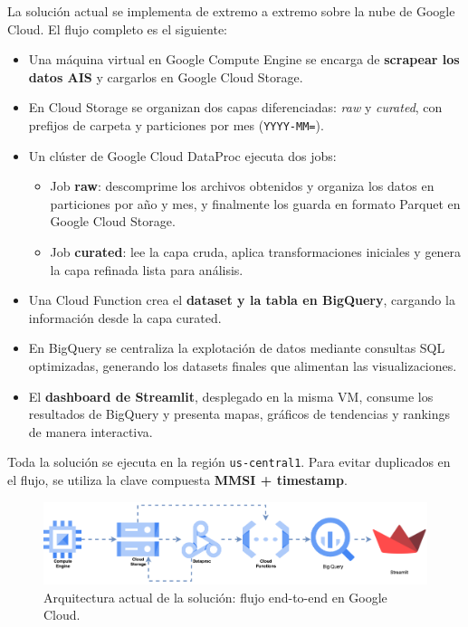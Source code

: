 \documentclass[10pt]{article}
\begin{document}
La solución actual se implementa de extremo a extremo sobre la nube de Google Cloud. El flujo completo es el siguiente:

\begin{itemize}
    \item Una máquina virtual en Google Compute Engine se encarga de \textbf{scrapear los datos AIS} y cargarlos en Google Cloud Storage. 
    \item En Cloud Storage se organizan dos capas diferenciadas: \textit{raw} y \textit{curated}, con prefijos de carpeta y particiones por mes (\texttt{YYYY-MM=}).
    \item Un clúster de Google Cloud DataProc ejecuta dos jobs:
    \begin{itemize}
        \item Job \textbf{raw}: descomprime los archivos obtenidos y organiza los datos en particiones por año y mes, y finalmente los guarda en formato Parquet en Google Cloud Storage.
        \item Job \textbf{curated}: lee la capa cruda, aplica transformaciones iniciales y genera la capa refinada lista para análisis.
    \end{itemize}
    \item Una Cloud Function crea el \textbf{dataset y la tabla en BigQuery}, cargando la información desde la capa curated.
    \item En BigQuery se centraliza la explotación de datos mediante consultas SQL optimizadas, generando los datasets finales que alimentan las visualizaciones.
    \item El \textbf{dashboard de Streamlit}, desplegado en la misma VM, consume los resultados de BigQuery y presenta mapas, gráficos de tendencias y rankings de manera interactiva.
\end{itemize}

Toda la solución se ejecuta en la región \texttt{us-central1}. Para evitar duplicados en el flujo, se utiliza la clave compuesta \textbf{MMSI + timestamp}.
\vspace{0.5cm}
\begin{figure}[H]
    \centering
    \includegraphics[width=\textwidth]{../figures/arch/ArchitectureDiagram.png}
    \caption{Arquitectura actual de la solución: flujo end-to-end en Google Cloud.}
\end{figure}
\vspace{0.1cm}
\end{document}

